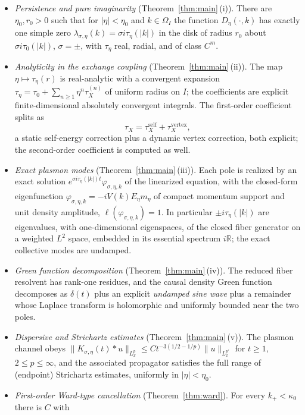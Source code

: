 \documentclass[11pt,a4paper]{amsart}
\theoremstyle{definition}
\theoremstyle{remark}
\newcommand{\R}{\mathbb{R}}
\newcommand{\ellf}{\ell}
\begin{document}
\begin{itemize}
\item[(a)] \emph{Persistence and pure imaginarity} (Theorem~\ref{thm:main}\,(i)). There are $\eta_0,r_0>0$ such that for $|\eta|<\eta_0$ and $k\in\Omega_I$ the function $D_\eta(\cdot,k)$ has exactly one simple zero $\lambda_{\sigma,\eta}(k)=\sigma i\tau_\eta(|k|)$ in the disk of radius $r_0$ about $\sigma i\tau_0(|k|)$, $\sigma=\pm$, with $\tau_\eta$ real, radial, and of class $C^m$.
\item[(b)] \emph{Analyticity in the exchange coupling} (Theorem~\ref{thm:main}\,(ii)). The map $\eta\mapsto\tau_\eta(r)$ is real-analytic with a convergent expansion $\tau_\eta=\tau_0+\sum_{n\ge1}\eta^n\tau_X^{(n)}$ of uniform radius on $I$; the coefficients are explicit finite-dimensional absolutely convergent integrals. The first-order coefficient splits as
\[
\tau_X=\tau_X^{\mathrm{self}}+\tau_X^{\mathrm{vertex}},
\]
a static self-energy correction plus a dynamic vertex correction, both explicit; the second-order coefficient is computed as well.
\item[(c)] \emph{Exact plasmon modes} (Theorem~\ref{thm:main}\,(iii)). Each pole is realized by an exact solution $e^{\sigma i\tau_\eta(|k|)t}\varphi_{\sigma,\eta,k}$ of the linearized equation, with the closed-form eigenfunction $\varphi_{\sigma,\eta,k}=-iV(k)E_\eta m_\eta$ of compact momentum support and unit density amplitude, $\ellf(\varphi_{\sigma,\eta,k})=1$. In particular $\pm i\tau_\eta(|k|)$ are eigenvalues, with one-dimensional eigenspaces, of the closed fiber generator on a weighted $L^2$ space, embedded in its essential spectrum $i\R$; the exact collective modes are undamped.
\item[(d)] \emph{Green function decomposition} (Theorem~\ref{thm:main}\,(iv)). The reduced fiber resolvent has rank-one residues, and the causal density Green function decomposes as $\delta(t)$ plus an explicit \emph{undamped sine wave} plus a remainder whose Laplace transform is holomorphic and uniformly bounded near the two poles.
\item[(e)] \emph{Dispersive and Strichartz estimates} (Theorem~\ref{thm:main}\,(v)). The plasmon channel obeys $\|K_{\sigma,\eta}(t)*u\|_{L^p_x}\le Ct^{-3(1/2-1/p)}\|u\|_{L^{p'}_x}$ for $t\ge1$, $2\le p\le\infty$, and the associated propagator satisfies the full range of (endpoint) Strichartz estimates, uniformly in $|\eta|<\eta_0$.
\item[(f)] \emph{First-order Ward-type cancellation} (Theorem~\ref{thm:ward}). For every $k_+<\kappa_0$ there is $C$ with

\end{itemize}
\end{document}
